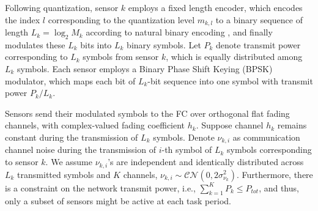 \documentclass[conference]{IEEEtran}
\begin{document}
%
Following quantization, sensor $k$ employs a fixed length encoder, which encodes the index $l$ corresponding to the quantization level $m_{k,l}$ to a binary sequence of length $L_k=\log_2 M_k$ according to natural binary encoding \cite{Vandendorpe_2012,Vosoughi_Sani_2016}, and finally modulates these $L_k$ bits into $L_k$ binary symbols. Let $P_k$ denote transmit power corresponding to $L_k$ symbols from sensor $k$, which is equally distributed among $L_k$ symbols. Each sensor employs a Binary Phase Shift Keying (BPSK) modulator, which maps each bit of $L_k$-bit sequence into one symbol with transmit power $P_k/L_k$.

Sensors send their modulated symbols to the FC over orthogonal flat fading channels, with complex-valued fading coefficient $h_k$. 
Suppose channel $h_k$ remains constant during the transmission of $L_k$ symbols. 
Denote $\nu_{k,i}$ as communication channel noise during the transmission of $i$-th symbol of $L_k$ symbols corresponding to sensor $k$. We assume $\nu_{k,i}$'s are independent and identically distributed across $L_k$ transmitted symbols and $K$ channels, $\nu_{k,i}\sim \mathcal{CN}\left(0,2\sigma_{\nu_k}^2\right)$. Furthermore, there is a constraint on the network transmit power, i.e., $\sum_{k=1}^{K}P_k\leq P_{tot}$, and thus, only a subset of sensors might be active at each task period.
\end{document}
